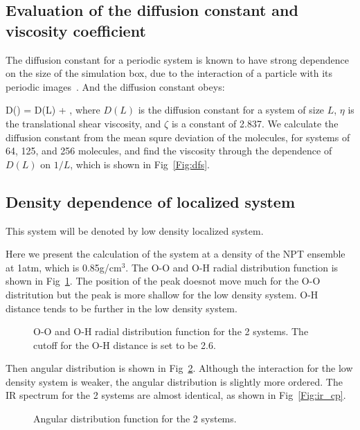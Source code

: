 \documentclass[aps,prl,reprint,amsmath,amssymb]{revtex4-1}
\begin{document}
\subsection{Evaluation of the diffusion constant and viscosity coefficient} 

The diffusion constant for a periodic system is known to have strong dependence on the size of the simulation box, due to the interaction of a particle with its periodic images~\cite{dunweg1993molecular}. And the diffusion constant obeys:

\bea
D(\infty) = D(L) + ,
\eea
where $D(L)$ is the diffusion constant for a system of size $L$, $\eta$ is the translational shear viscosity, and $\zeta$ is a constant of 2.837. We calculate the diffusion constant from the mean squre deviation of the molecules, for systems of 64, 125, and 256 molecules, and find the viscosity through the dependence of $D(L)$ on $1/L$, which is shown in Fig~\ref{Fig:dfs}. 

\subsection{Density dependence of localized system} 

This system will be denoted by low density localized system.

Here we present the calculation of the system at a density of the NPT ensemble at 1atm, which is 0.85g/cm$^3$. The O-O and O-H radial distribution function is shown in Fig~\ref{Fig:rdf_cp}. The position of the peak doesnot move much for the O-O distritution but the peak is more shallow for the low density system. O-H distance tends to be further in the low density system.

\begin{figure}
\caption{O-O and O-H radial distribution function for the 2 systems. The cutoff for the O-H distance is set to be 2.6\Ang.}\label{Fig:rdf_cp}
\end{figure} 

Then angular distribution is shown in Fig~\ref{Fig:adfcp}. Although the interaction for the low density system is weaker, the angular distribution is slightly more ordered. The IR spectrum for the 2 systems are almost identical, as shown in Fig~\ref{Fig:ir_cp}.

\begin{figure}
\caption{Angular distribution function for the 2 systems.}\label{Fig:adfcp}
\end{figure} 
\end{document}
